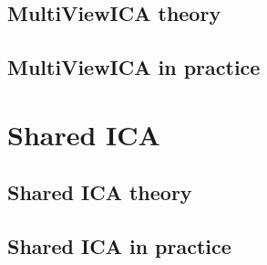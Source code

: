 \documentclass[ twoside,openright,titlepage,numbers=noenddot,%
                headinclude,footinclude,cleardoublepage=empty,abstract=on,
                BCOR=5mm,paper=a4,fontsize=11pt, 
                ]{scrreprt}
\begin{document}
\chapter{MultiViewICA theory}

\chapter{MultiViewICA in practice}
\label{chap:mvica_exp}

\part{Shared ICA}
\chapter{Shared ICA theory}

\chapter{Shared ICA in practice}

% 
% 
\end{document}

